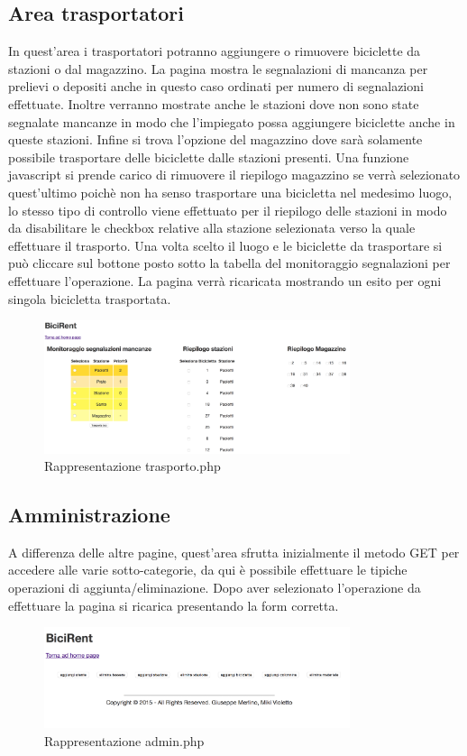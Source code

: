 \documentclass[a4paper,twoside]{article}
\begin{document}
\subsection{Area trasportatori}
In quest'area i trasportatori potranno aggiungere o rimuovere biciclette da stazioni o dal magazzino. La pagina mostra le segnalazioni di mancanza per prelievi o depositi anche in questo caso ordinati per numero di segnalazioni effettuate. Inoltre verranno mostrate anche le stazioni dove non sono state segnalate mancanze in modo che l'impiegato possa aggiungere biciclette anche in queste stazioni. Infine si trova l'opzione del magazzino dove sarà solamente possibile trasportare delle biciclette dalle stazioni presenti. Una funzione javascript si prende carico di rimuovere il riepilogo magazzino se verrà selezionato quest'ultimo poichè non ha senso trasportare una bicicletta nel medesimo luogo, lo stesso tipo di controllo viene effettuato per il riepilogo delle stazioni in modo da disabilitare le checkbox relative alla stazione selezionata verso la quale effettuare il trasporto. Una volta scelto il luogo e le biciclette da trasportare si può cliccare sul bottone posto sotto la tabella del monitoraggio segnalazioni per effettuare l'operazione.
La pagina verrà ricaricata mostrando un esito per ogni singola bicicletta trasportata.
\begin{figure}[H]
	\centering
	\includegraphics[width=0.8\textwidth]{Screenshot05}
	\caption{Rappresentazione trasporto.php}
\end{figure}
\subsection{Amministrazione}
A differenza delle altre pagine, quest'area sfrutta inizialmente il metodo GET per accedere alle varie sotto-categorie, da qui è possibile effettuare le tipiche operazioni di aggiunta/eliminazione.
Dopo aver selezionato l'operazione da effettuare la pagina si ricarica presentando la form corretta.
\begin{figure}[H]
	\centering
	\includegraphics[width=0.8\textwidth]{Screenshot06}
	\caption{Rappresentazione admin.php}
\end{figure}
\end{document}
